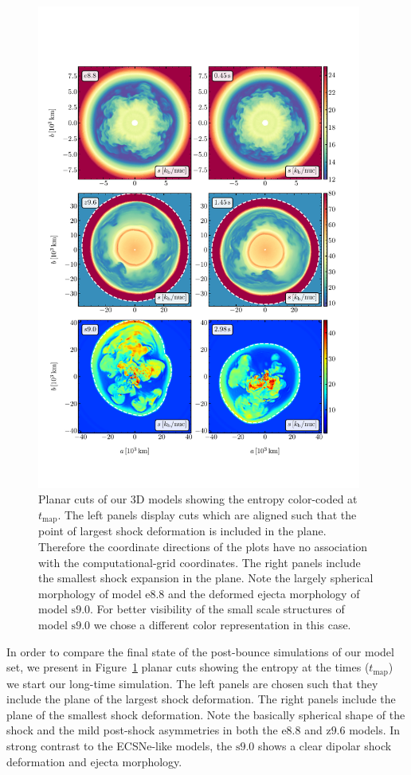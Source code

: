 \documentclass[fleqn,usenatbib]{mnras}
\newcommand{\onemg}{\ensuremath{\mathrm{e8.8}}\xspace}
\newcommand{\snine}{\ensuremath{\mathrm{s9.0}}\xspace}
\newcommand{\znine}{\ensuremath{\mathrm{z9.6}}\xspace}
\newcommand{\GEO}[1]{{\color{red}#1}}
\begin{document}
\begin{figure}
 \centering
 \includegraphics[width=0.95\textwidth,trim=0cm 1.8cm 0cm 3cm,clip]{pic/all_3d_sto_slices_time_0.pdf}
 \caption{Planar cuts of our 3D models showing the entropy color-coded at $t_{\mathrm{map}}$. The left panels display cuts which are aligned such that the point of largest shock deformation is included in the plane. Therefore the coordinate directions of the plots have no association with the computational-grid coordinates. The right panels include the smallest shock expansion in the plane. Note the largely spherical morphology of model \onemg and the deformed ejecta morphology of model \snine. For better visibility of the small scale structures of model \snine we chose a different color representation in this case.}
 \label{fig:slices first mapping}
\end{figure}
In order to compare the final state of the post-bounce simulations of our model set, we \GEO{present} in Figure~\ref{fig:slices first mapping} planar cuts showing the entropy at the times ($t_{\mathrm{map}}$) we start our long-time simulation. The left panels are chosen such that they include the plane of the largest shock deformation. The right panels include the plane of the smallest shock deformation.
Note the \GEO{basically spherical shape of the shock and the mild post-shock asymmetries} in both the \onemg and \znine models.
In strong contrast to the ECSNe-like models, the \snine shows a clear dipolar shock deformation and ejecta morphology. 
\end{document}
